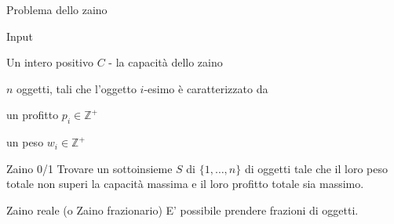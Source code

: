\begin{frame}{Problema dello zaino}

\vspace{-6pt}
\begin{block}{Input}
\BIL
\item Un intero positivo $C$  - la capacità dello zaino
\item $n$ oggetti, tali che l'oggetto $i$-esimo è caratterizzato da
  \BI
	\item un profitto $p_i \in \mathbb{Z^+}$  
  \item un peso $w_i \in \mathbb{Z^+}$
	\EI
\EIL
\end{block}

	
\begin{block}{Zaino 0/1}
Trovare un sottoinsieme $S$ di $\{1, \ldots , n\}$ di oggetti tale che il loro
peso totale non superi la capacità massima e il loro profitto totale sia
massimo.
\end{block}

\begin{block}{Zaino reale (o Zaino frazionario)}
E' possibile prendere frazioni di oggetti.
\end{block}

\end{frame}

